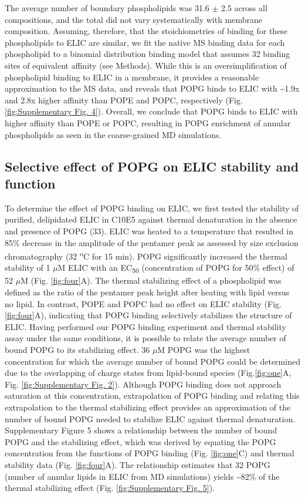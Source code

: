 The average number of boundary phospholipids was 31.6 $\pm$ 2.5 across all
compositions, and the total did not vary systematically with membrane
composition. Assuming, therefore, that the stoichiometries of binding
for these phospholipids to ELIC are similar, we fit the native MS
binding data for each phospholipid to a binomial distribution binding
model that assumes 32 binding sites of equivalent affinity (see
Methods). While this is an oversimplification of phospholipid binding to
ELIC in a membrane, it provides a reasonable approximation to the MS
data, and reveals that POPG binds to ELIC with \textasciitilde{}1.9x and
2.8x higher affinity than POPE and POPC, respectively (Fig. \ref{fig:Supplementary
Fig. 4}). Overall, we conclude that POPG binds to ELIC with higher
affinity than POPE or POPC, resulting in POPG enrichment of annular
phospholipids as seen in the coarse-grained MD simulations.

\subsection{Selective effect of POPG on ELIC stability and function}

To determine the effect of POPG binding on ELIC, we first tested the
stability of purified, delipidated ELIC in C10E5 against thermal
denaturation in the absence and presence of POPG (33). ELIC was heated
to a temperature that resulted in 85\% decrease in the amplitude of the
pentamer peak as assessed by size exclusion chromatography (32
\textsuperscript{o}C for 15 min). POPG significantly increased the
thermal stability of 1 $\mu$M ELIC with an EC\textsubscript{50}
(concentration of POPG for 50\% effect) of 52 $\mu$M (Fig. \ref{fig:four}A). The thermal
stabilizing effect of a phospholipid was defined as the ratio of the
pentamer peak height after heating with lipid versus no lipid. In
contrast, POPE and POPC had no effect on ELIC stability (Fig. \ref{fig:four}A),
indicating that POPG binding selectively stabilizes the structure of
ELIC. Having performed our POPG binding experiment and thermal stability
assay under the same conditions, it is possible to relate the average
number of bound POPG to its stabilizing effect. 36 $\mu$M POPG was the
highest concentration for which the average number of bound POPG could
be determined due to the overlapping of charge states from lipid-bound
species (Fig.\ref{fig:one}A, Fig. \ref{fig:Supplementary Fig. 2}). Although POPG binding does not
approach saturation at this concentration, extrapolation of POPG binding
and relating this extrapolation to the thermal stabilizing effect
provides an approximation of the number of bound POPG needed to
stabilize ELIC against thermal denaturation. Supplementary Figure 5
shows a relationship between the number of bound POPG and the
stabilizing effect, which was derived by equating the POPG concentration
from the functions of POPG binding (Fig. \ref{fig:one}C) and thermal stability data
(Fig. \ref{fig:four}A). The relationship estimates that 32 POPG (number of annular
lipids in ELIC from MD simulations) yields \textasciitilde{}82\% of the
thermal stabilizing effect (Fig. \ref{fig:Supplementary Fig. 5}).

